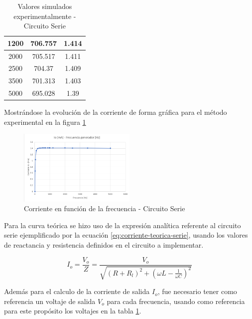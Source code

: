 \documentclass[conference]{IEEEtran}
\begin{document}
\begin{table}[h]
\begin{tabular}{|ccc|}
			\multicolumn{1}{|c|}{1200}            & \multicolumn{1}{c|}{706.757}              & 1.414                \\ \hline
			\multicolumn{1}{|c|}{2000}            & \multicolumn{1}{c|}{705.517}              & 1.411                \\ \hline
			\multicolumn{1}{|c|}{2500}            & \multicolumn{1}{c|}{704.37}               & 1.409                \\ \hline
			\multicolumn{1}{|c|}{3500}            & \multicolumn{1}{c|}{701.313}              & 1.403                \\ \hline
			\multicolumn{1}{|c|}{5000}            & \multicolumn{1}{c|}{695.028}              & 1.39                 \\ \hline
		\end{tabular}
		\caption{Valores simulados experimentalmente - Circuito Serie}
		\label{tab:mediciones-serie}
	\end{table}
	
	Mostrándose la evolución de la corriente de forma gráfica para el método experimental en la figura \ref{fig:grafica-corriente-serie}
	
	\begin{figure}[h]
		\centering
		\includegraphics[width=0.5\textwidth]{media/grafica-corriente-serie}
		\caption{Corriente en función de la frecuencia - Circuito Serie}
		\label{fig:grafica-corriente-serie}
	\end{figure}
	
	Para la curva teórica se hizo uso de la expresión analítica referente al circuito serie ejemplificado por la ecuación \ref{eq:corriente-teorica-serie}, usando los valores de reactancia y resistencia definidos en el circuito a implementar.
	
	\begin{equation}
		I_o = \frac{V_o}{Z} = \frac{V_o}{\sqrt{(R + R_l)^2 + (\omega L - \frac{1}{\omega C})^2}}
		\label{eq:corriente-teorica-serie}
	\end{equation}
	
	Además para el calculo de la corriente de salida $I_o$, fue necesario tener como referencia un voltaje de salida $V_o$ para cada frecuencia, usando como referencia para este propósito los voltajes en la tabla \ref{tab:mediciones-serie}.
	
\end{document}
